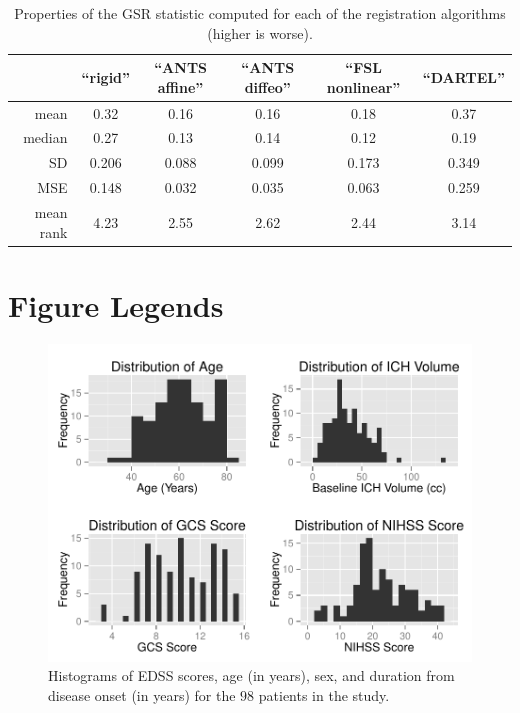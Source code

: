 \documentclass[10pt]{article}
\begin{document}
\begin{table}[ht!]
\begin{center}
\caption{Properties of the GSR statistic computed for each of the registration algorithms
(higher is worse).}\label{t:gsr}
\begin{tabular}{rccccc}
& ``rigid'' & ``ANTS affine'' & ``ANTS diffeo'' & ``FSL nonlinear''  & ``DARTEL''\\
\hline
mean &  0.32  &  0.16 &  0.16 & 0.18 & 0.37 \\
median & 0.27 & 0.13 & 0.14 & 0.12 & 0.19 \\
SD &  0.206 & 0.088 & 0.099 & 0.173 & 0.349 \\
MSE & 0.148 & 0.032 & 0.035 & 0.063 & 0.259 \\
mean rank & 4.23 & 2.55 & 2.62 & 2.44 & 3.14 \\
\end{tabular}
\end{center}
\end{table}



\newpage

\section*{Figure Legends}

\begin{figure}[ht!]
\begin{center}
\includegraphics[scale=0.45]{histdem.pdf}
\end{center}
\caption{Histograms of EDSS scores, age (in years), sex, and duration from disease onset (in years) for the $98$ patients in the study.}\label{fig:histdem}
\end{figure}
\end{document}
